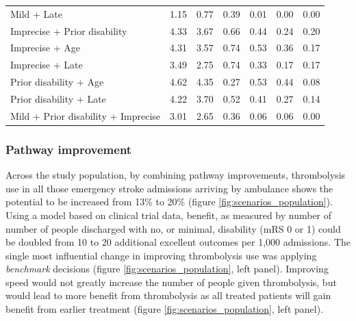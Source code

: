 \begin{minipage}{1\textwidth}
\begin{longtable}{p{5.2cm} | p{1.6cm} p{1.6cm} p{1.5cm} | p{1.6cm} p{1.6cm} p{1.5cm}}
Mild + Late & 1.15 & 0.77 & 0.39 & 0.01 & 0.00 & 0.00\\
Imprecise + Prior disability & 4.33 & 3.67 & 0.66 & 0.44 & 0.24 & 0.20\\
Imprecise + Age & 4.31 & 3.57 & 0.74 & 0.53 & 0.36 & 0.17\\
Imprecise + Late & 3.49 & 2.75 & 0.74 & 0.33 & 0.17 & 0.17\\
Prior disability + Age & 4.62 & 4.35 & 0.27 & 0.53 & 0.44 & 0.08\\
Prior disability + Late & 4.22 & 3.70 & 0.52 & 0.41 & 0.27 & 0.14\\
Mild + Prior disability + Imprecise & 3.01 & 2.65 & 0.36 & 0.06 & 0.06 & 0.00\\
\end{longtable}
\normalsize
\end{minipage}

\subsubsection{Pathway improvement}

Across the study population, by combining pathway improvements, thrombolysis use in all those emergency stroke admissions arriving by ambulance shows the potential to be increased from 13\% to 20\% (figure \ref{fig:scenarios_population}). Using a model based on clinical trial data, benefit, as measured by number of number of people discharged with no, or minimal, disability (mRS 0 or 1) could be doubled from 10 to 20 additional excellent outcomes per 1,000 admissions. The single most influential change in improving thrombolysis use was applying \textit{benchmark} decisions (figure \ref{fig:scenarios_population}, left panel). Improving speed would not greatly increase the number of people given thrombolysis, but would lead to more benefit from thrombolysis as all treated patients will gain benefit from earlier treatment (figure \ref{fig:scenarios_population}, left panel).

